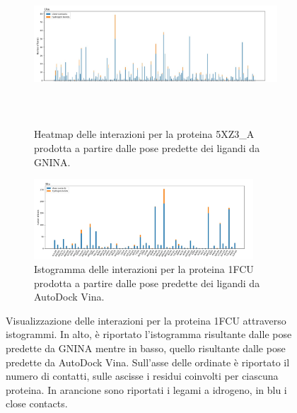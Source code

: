 \begin{figure}
    \centering
    \begin{subfigure}[b]{\textwidth}
        \centering
        \includegraphics[width=\textwidth, height=6cm]{immagini/capitolo4/interactions_gnina_1fcu.jpg}
        \caption[]%
        {{\small Heatmap delle interazioni per la proteina 5XZ3\_A prodotta a partire dalle pose predette dei ligandi da GNINA.}}    
        \label{fig:interactions_gnina_1fcu}
    \end{subfigure}
    \hfill
    \begin{subfigure}[b]{\textwidth}  
        \centering 
        \includegraphics[width=0.9\textwidth, height=3cm]{immagini/capitolo4/interactions_vina_1fcu.jpg}
        \caption[]%
        {{\small Istogramma delle interazioni per la proteina 1FCU prodotta a partire dalle pose predette dei ligandi da AutoDock Vina.}}    
        \label{fig:interactions_vina_1fcu}
    \end{subfigure}
    \caption[Visualizzazione degli istogrammi per la proteina 1FCU.]
    {\small Visualizzazione delle interazioni per la proteina 1FCU attraverso istogrammi. In alto, è riportato l'istogramma risultante dalle pose predette da GNINA mentre in basso, quello risultante dalle pose predette da AutoDock Vina. Sull'asse delle ordinate è riportato il numero di contatti, sulle ascisse i residui coinvolti per ciascuna proteina. In arancione sono riportati i legami a idrogeno, in blu i close contacts. } 
    \label{fig:int_1fcu}
\end{figure}


